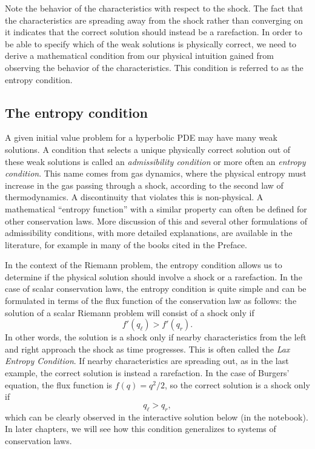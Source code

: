 \documentclass{SIAMbook2016}
\begin{document}
Note the behavior of the characteristics with respect to the shock. The
fact that the characteristics are spreading away from the shock rather
than converging on it indicates that the correct solution should instead
be a rarefaction. In order to be able to specify which of the weak
solutions is physically correct, we need to derive a mathematical
condition from our physical intuition gained from observing the behavior
of the characteristics. This condition is referred to as the entropy
condition.

\hypertarget{the-entropy-condition}{%
\subsection{The entropy condition}\label{the-entropy-condition}}

A given initial value problem for a hyperbolic PDE may have many weak
solutions. A condition that selects a unique physically correct solution
out of these weak solutions is called an \emph{admissibility condition}
or more often an \emph{entropy condition}. This name comes from gas
dynamics, where the physical entropy must increase in the gas passing
through a shock, according to the second law of thermodynamics. A
discontinuity that violates this is non-physical. A mathematical
``entropy function'' with a similar property can often be defined for
other conservation laws. More discussion of this and several other
formulations of admissibility conditions, with more detailed
explanations, are available in the literature, for example in many of
the books cited in the Preface.

In the context of the Riemann problem, the entropy condition allows us
to determine if the physical solution should involve a shock or a
rarefaction. In the case of scalar conservation laws, the entropy
condition is quite simple and can be formulated in terms of the flux
function of the conservation law as follows: the solution of a scalar
Riemann problem will consist of a shock only if \[
f'(q_\ell) > f'(q_r).
\] In other words, the solution is a shock only if nearby
characteristics from the left and right approach the shock as time
progresses. This is often called the \emph{Lax Entropy Condition}. If
nearby characteristics are spreading out, as in the last example, the
correct solution is instead a rarefaction. In the case of Burgers'
equation, the flux function is \(f(q)=q^2/2\), so the correct solution
is a shock only if \[
q_\ell > q_r,
\] which can be clearly observed in the interactive solution below (in
the notebook). In later chapters, we will see how this condition
generalizes to systems of conservation laws.
\end{document}
